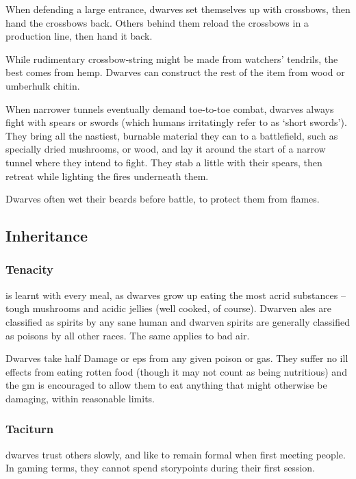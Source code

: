 When defending a large entrance, dwarves set themselves up with crossbows, then hand the crossbows back.
Others behind them reload the crossbows in a production line, then hand it back.

While rudimentary crossbow-string might be made from watchers' tendrils, the best comes from hemp.
Dwarves can construct the rest of the item from wood or umberhulk chitin.

When narrower tunnels eventually demand toe-to-toe combat, dwarves always fight with spears or swords (which humans irritatingly refer to as `short swords').
They bring all the nastiest, burnable material they can to a battlefield, such as specially dried mushrooms, or wood, and lay it around the start of a narrow tunnel where they intend to fight.
They stab a little with their spears, then retreat while lighting the fires underneath them.

Dwarves often wet their beards before battle, to protect them from flames.

\subsection{Inheritance}

\subsubsection[Tenacity: dwarves take only half the usual penalties from rotten food, poisons, or foul air.]{Tenacity}
\label{dwarvenInheritance}
is learnt with every meal, as dwarves grow up eating the most acrid substances -- tough mushrooms and acidic jellies (well cooked, of course).
Dwarven ales are classified as spirits by any sane human and dwarven spirits are generally classified as poisons by all other races.
The same applies to bad air.

Dwarves take half Damage or \glspl{ep} from any given poison or gas.
They suffer no ill effects from eating rotten food (though it may not count as being nutritious) and the \gls{gm} is encouraged to allow them to eat anything that might otherwise be damaging, within reasonable limits.

\subsubsection{Taciturn}
dwarves trust others slowly, and like to remain formal when first meeting people.
In gaming terms, they cannot spend \glspl{storypoint} during their first session.

